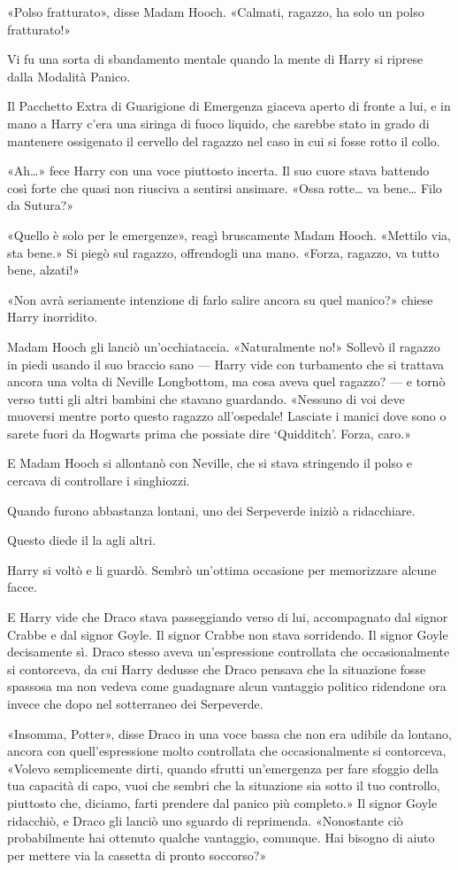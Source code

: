 «Polso fratturato», disse Madam Hooch. «Calmati, ragazzo, ha solo un polso fratturato!»

Vi fu una sorta di sbandamento mentale quando la mente di Harry si riprese dalla Modalità Panico.

Il Pacchetto Extra di Guarigione di Emergenza giaceva aperto di fronte a lui, e in mano a Harry c’era una siringa di fuoco liquido, che sarebbe stato in grado di mantenere ossigenato il cervello del ragazzo nel caso in cui si fosse rotto il collo.

«Ah…» fece Harry con una voce piuttosto incerta. Il suo cuore stava battendo così forte che quasi non riusciva a sentirsi ansimare. «Ossa rotte… va bene… Filo da Sutura?»

«Quello è solo per le emergenze», reagì bruscamente Madam Hooch. «Mettilo via, sta bene.» Si piegò sul ragazzo, offrendogli una mano. «Forza, ragazzo, va tutto bene, alzati!»

«Non avrà seriamente intenzione di farlo salire ancora su quel manico?» chiese Harry inorridito.

Madam Hooch gli lanciò un’occhiataccia. «Naturalmente no!» Sollevò il ragazzo in piedi usando il suo braccio sano — Harry vide con turbamento che si trattava ancora una volta di Neville Longbottom, ma cosa aveva quel ragazzo? — e tornò verso tutti gli altri bambini che stavano guardando. «Nessuno di voi deve muoversi mentre porto questo ragazzo all’ospedale! Lasciate i manici dove sono o sarete fuori da Hogwarts prima che possiate dire ‘Quidditch’. Forza, caro.»

E Madam Hooch si allontanò con Neville, che si stava stringendo il polso e cercava di controllare i singhiozzi.

Quando furono abbastanza lontani, uno dei Serpeverde iniziò a ridacchiare.

Questo diede il la agli altri.

Harry si voltò e li guardò. Sembrò un’ottima occasione per memorizzare alcune facce.

E Harry vide che Draco stava passeggiando verso di lui, accompagnato dal signor Crabbe e dal signor Goyle. Il signor Crabbe non stava sorridendo. Il signor Goyle decisamente sì. Draco stesso aveva un’espressione controllata che occasionalmente si contorceva, da cui Harry dedusse che Draco pensava che la situazione fosse spassosa ma non vedeva come guadagnare alcun vantaggio politico ridendone ora invece che dopo nel sotterraneo dei Serpeverde.

«Insomma, Potter», disse Draco in una voce bassa che non era udibile da lontano, ancora con quell’espressione molto controllata che occasionalmente si contorceva, «Volevo semplicemente dirti, quando sfrutti un’emergenza per fare sfoggio della tua capacità di capo, vuoi che sembri che la situazione sia sotto il tuo controllo, piuttosto che, diciamo, farti prendere dal panico più completo.» Il signor Goyle ridacchiò, e Draco gli lanciò uno sguardo di reprimenda. «Nonostante ciò probabilmente hai ottenuto qualche vantaggio, comunque. Hai bisogno di aiuto per mettere via la cassetta di pronto soccorso?»

